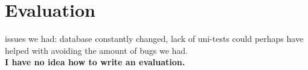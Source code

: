 \section{Evaluation}
issues we had:
database constantly changed, lack of uni-tests could perhaps have helped with avoiding the amount of bugs we had.\\ \textbf{I have no idea how to write an evaluation.}